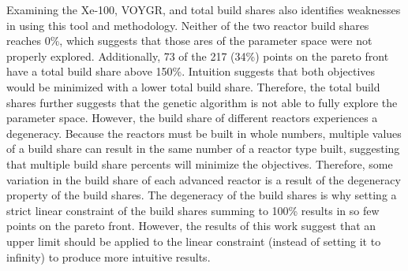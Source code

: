 Examining the Xe-100, VOYGR, and total build shares also identifies 
weaknesses in using this tool and methodology. Neither of the two reactor 
build shares reaches 0\%, which suggests that those ares of the parameter 
space were not properly explored. Additionally, 73 of the 217 (34\%) points 
on the pareto front have a total build share above 150\%. Intuition 
suggests that both objectives would be minimized with a lower total 
build share. Therefore, the total build shares further suggests that the 
genetic algorithm is not able to fully explore the parameter space. 
However, the build share of different reactors experiences a degeneracy. 
Because the reactors must be built in whole numbers, multiple values of 
a build share can result in the same number of a reactor type built, 
suggesting that multiple build share percents will minimize the 
objectives. Therefore, some variation in the build share of each 
advanced reactor is a result of the degeneracy property of the build 
shares. The degeneracy of the build shares is why setting a strict 
linear constraint of the build shares summing to 100\% results in 
so few points on the pareto front. However, the results of this work 
suggest that an upper limit should be applied to the linear constraint 
(instead of setting it to infinity) to produce more intuitive results. 